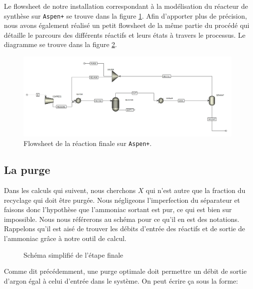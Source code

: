 \documentclass[a4paper, oneside, 12pt]{article}
\begin{document}
Le flowsheet de notre installation correspondant à la modélisation 
du réacteur de synthèse sur \texttt{Aspen+} 
se trouve dans la figure \ref{fig:flow_aspen}.
Afin d'apporter plus de précision, nous avons également réalisé un petit 
flowsheet de la même partie du procédé qui détaille le parcours des 
différents réactifs et leurs états à travers le processus.
Le diagramme se trouve dans la figure \ref{fig:flow_synthese}.

\begin{figure}[h!]
	\begin{center}
		\includegraphics[scale=0.45,angle=90]{Flowsheet_ASPEN.jpg}
	\end{center}
	\caption{Flowsheet de la réaction finale sur \texttt{Aspen+}.}
	\label{fig:flow_aspen}
\end{figure}

\subsection{La purge}

Dans les calculs qui suivent, nous cherchons $X$ qui n'est autre que 
la fraction du recyclage qui doit être purgée. 
Nous négligeons l'imperfection du séparateur et faisons donc l'hypothèse 
que l'ammoniac sortant est pur, ce qui est bien sur impossible. 
Nous nous référerons au schéma pour ce qu'il en est des notations. 
Rappelons qu'il est aisé de trouver les débits d'entrée des réactifs 
et de sortie de l'ammoniac grâce à notre outil de calcul.

\begin{figure}[h!]
	\begin{center}
		
	\end{center}
	\caption{Schéma simplifié de l'étape finale}
	\label{fig:flow_synthese}
\end{figure}

Comme dit précédemment, une purge optimale doit permettre un débit 
de sortie d'argon égal à celui d'entrée dans le système. 
On peut écrire ça sous la forme:
\end{document}
